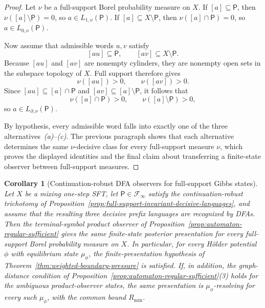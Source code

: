 \documentclass{etds}%
\numberwithin{equation}{section}
\theoremstyle{plain}
\newtheorem{corollary}[theorem]{Corollary}
\theoremstyle{definition}
\theoremstyle{remark}
\begin{document}
\begin{proof}
Let $\nu$ be a full-support Borel probability measure on $X$.
If $[a]\subseteq \mathsf{P}$, then $\nu([a]\setminus\mathsf{P})=0$, so
$a\in L_{1,\nu}(\mathsf{P})$.  If
$[a]\subseteq X\setminus \mathsf{P}$, then $\nu([a]\cap\mathsf{P})=0$, so
$a\in L_{0,\nu}(\mathsf{P})$.

Now assume that admissible words $u,v$ satisfy
\[
[au]\subseteq \mathsf{P},
\qquad
[av]\subseteq X\setminus \mathsf{P}.
\]
Because $[au]$ and $[av]$ are nonempty cylinders, they are nonempty open sets
in the subspace topology of $X$.  Full support therefore gives
\[
\nu([au])>0,
\qquad
\nu([av])>0.
\]
Since $[au]\subseteq [a]\cap\mathsf{P}$ and
$[av]\subseteq [a]\setminus\mathsf{P}$, it follows that
\[
\nu([a]\cap\mathsf{P})>0,
\qquad
\nu([a]\setminus\mathsf{P})>0,
\]
so $a\in L_{\partial,\nu}(\mathsf{P})$.

By hypothesis, every admissible word falls into exactly one of the three
alternatives~\emph{(a)}--\emph{(c)}.  The previous paragraph shows that each
alternative determines the same $\nu$-decisive class for every full-support
measure $\nu$, which proves the displayed identities and the final claim about
transferring a finite-state observer between full-support measures.
\end{proof}

\begin{corollary}[Continuation-robust DFA observers for full-support Gibbs states]
\label{cor:continuation-robust-dfa-gibbs-observer}
Let $X$ be a mixing one-step SFT, let
$\mathsf{P}\in\mathcal{F}_\infty$ satisfy the continuation-robust trichotomy
of Proposition~\ref{prop:full-support-invariant-decisive-languages}, and
assume that the resulting three decisive prefix languages are recognized by
DFAs.  Then the terminal-symbol product observer of
Proposition~\ref{prop:automaton-regular-sufficient} gives the same
finite-state posterior presentation for every full-support Borel probability
measure on $X$.  In particular, for every H\"older potential $\phi$ with
equilibrium state $\mu_\phi$, the finite-presentation hypothesis of
Theorem~\ref{thm:weighted-boundary-pressure} is satisfied.  If, in addition,
the graph-distance condition of
Proposition~\ref{prop:automaton-regular-sufficient}\emph{(3)} holds for the
ambiguous product-observer states, the same presentation is
$\mu_\phi$-resolving for every such $\mu_\phi$, with the common bound
$R_{\min}$.
\end{corollary}
\end{document}
